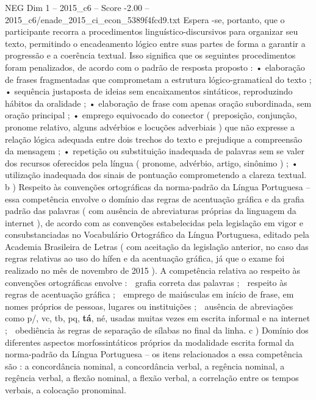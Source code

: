 \begin{textsample}{NEG Dim 1 – 2015\_c6 – Score -2.00 – 2015\_c6/enade\_2015\_ci\_econ\_5389f4fcd9.txt}
Espera -se, portanto, que o participante recorra a procedimentos linguístico-discursivos para organizar seu texto, permitindo o encadeamento lógico entre suas partes de forma a garantir a progressão e a coerência textual.
Isso significa que os seguintes procedimentos foram penalizados, de acordo com o padrão de resposta proposto : • elaboração de frases fragmentadas que comprometam a estrutura lógico-gramatical do texto ; • sequência justaposta de ideias sem encaixamentos sintáticos, reproduzindo hábitos da oralidade ; • elaboração de frase com apenas oração subordinada, sem oração principal ; • emprego equivocado do conector ( preposição, conjunção, pronome relativo, alguns advérbios e locuções adverbiais ) que não expresse a relação lógica adequada entre dois trechos do texto e prejudique a compreensão da mensagem ; • repetição ou substituição inadequada de palavras sem se valer dos recursos oferecidos pela língua ( pronome, advérbio, artigo, sinônimo ) ; • utilização inadequada dos sinais de pontuação comprometendo a clareza textual. b ) Respeito às convenções ortográficas da norma-padrão da Língua Portuguesa – essa competência envolve o domínio das regras de acentuação gráfica e da grafia padrão das palavras ( com ausência de abreviaturas próprias da linguagem da internet ), de acordo com as convenções estabelecidas pela legislação em vigor e consubstanciadas no Vocabulário Ortográfico da Língua Portuguesa, editado pela Academia Brasileira de Letras ( com aceitação da legislação anterior, no caso das regras relativas ao uso do hífen e da acentuação gráfica, já que o exame foi realizado no mês de novembro de 2015 ).
A competência relativa ao respeito às convenções ortográficas envolve :  grafia correta das palavras ;  respeito às regras de acentuação gráfica ;  emprego de maiúsculas em início de frase, em nomes próprios de pessoas, lugares ou instituições ;  ausência de abreviações como p/, vc, tb, pq, \textbf{tá}, né, usadas muitas vezes em escrita informal e na internet ;  obediência às regras de separação de sílabas no final da linha. c ) Domínio dos diferentes aspectos morfossintáticos próprios da modalidade escrita formal da norma-padrão da Língua Portuguesa – os itens relacionados a essa competência são : a concordância nominal, a concordância verbal, a regência nominal, a regência verbal, a flexão nominal, a flexão verbal, a correlação entre os tempos verbais, a colocação pronominal.

\end{textsample}
